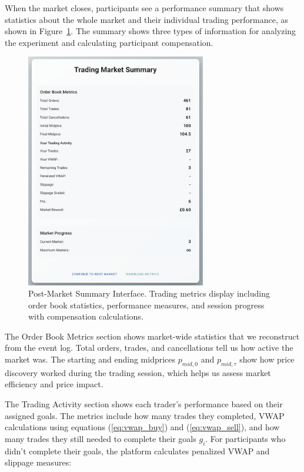 When the market closes, participants see a performance summary that shows statistics about the whole market and their individual trading performance, as shown in Figure~\ref{fig:summary}. The summary shows three types of information for analyzing the experiment and calculating participant compensation.

\begin{figure}[!htbp]
\centering
\includegraphics[width=0.7\textwidth]{figs/summary-page.png}
\caption{Post-Market Summary Interface. Trading metrics display including order book statistics, performance measures, and session progress with compensation calculations.}
\label{fig:summary}
\end{figure}

The Order Book Metrics section shows market-wide statistics that we reconstruct from the event log. Total orders, trades, and cancellations tell us how active the market was. The starting and ending midprices $p_{mid,0}$ and $p_{mid,\tau}$ show how price discovery worked during the trading session, which helps us assess market efficiency and price impact.

The Trading Activity section shows each trader's performance based on their assigned goals. The metrics include how many trades they completed, VWAP calculations using equations (\ref{eq:vwap_buy}) and (\ref{eq:vwap_sell}), and how many trades they still needed to complete their goals $g_i$. For participants who didn't complete their goals, the platform calculates penalized VWAP and slippage measures:

